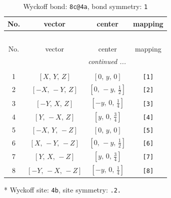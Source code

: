 \documentclass[fleqn,8pt]{jsarticle}
\begin{document}
\begin{longtable}{cccc}
\caption{Wyckoff bond: {\tt 8c@4a}, bond symmetry: {\tt 1}}
 \\
 \hline \hline
No. & vector & center & mapping \\ \hline \endfirsthead

\multicolumn{3}{l}{\tablename\ \thetable{}} \\
 \hline \hline
No. & vector & center & mapping \\ \hline \endhead

 \hline \hline
\multicolumn{3}{r}{\footnotesize\it continued ...} \\ \endfoot

 \hline \hline
\multicolumn{3}{r}{} \\ \endlastfoot

1 & $\left[ X,\, Y,\, Z \right]$ & $\left[ 0,\, y,\, 0 \right]$ & {\tt [1]} \\ \hline
2 & $\left[ - X,\, - Y,\, Z \right]$ & $\left[ 0,\, - y,\, \frac{1}{2} \right]$ & {\tt [2]} \\ \hline
3 & $\left[ - Y,\, X,\, Z \right]$ & $\left[ - y,\, 0,\, \frac{1}{4} \right]$ & {\tt [3]} \\ \hline
4 & $\left[ Y,\, - X,\, Z \right]$ & $\left[ y,\, 0,\, \frac{3}{4} \right]$ & {\tt [4]} \\ \hline
5 & $\left[ - X,\, Y,\, - Z \right]$ & $\left[ 0,\, y,\, 0 \right]$ & {\tt [5]} \\ \hline
6 & $\left[ X,\, - Y,\, - Z \right]$ & $\left[ 0,\, - y,\, \frac{1}{2} \right]$ & {\tt [6]} \\ \hline
7 & $\left[ Y,\, X,\, - Z \right]$ & $\left[ y,\, 0,\, \frac{3}{4} \right]$ & {\tt [7]} \\ \hline
8 & $\left[ - Y,\, - X,\, - Z \right]$ & $\left[ - y,\, 0,\, \frac{1}{4} \right]$ & {\tt [8]} \\
\end{longtable}
* Wyckoff site: {\tt 4b}, site symmetry: {\tt .2.}
\renewcommand{\arraystretch}{1.2}
\end{document}
